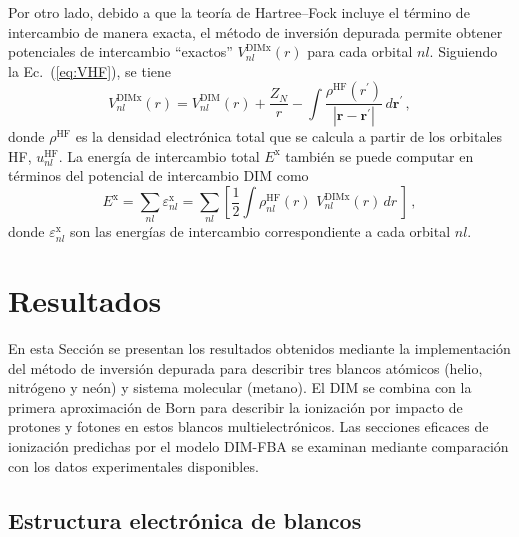 Por otro lado, debido a que la teoría de Hartree--Fock incluye el 
término de intercambio de manera exacta, el método de inversión depurada 
permite obtener potenciales de intercambio ``exactos'' 
$V_{nl}^{\mathrm{DIMx}}(r)$ para cada orbital $nl$. Siguiendo la  
Ec.~(\ref{eq:VHF}), se tiene 
\begin{equation}
V_{nl}^{\mathrm{DIMx}}(r)=V_{nl}^{\mathrm{DIM}}(r)+\frac{Z_{N}}{r}
-\int{ \frac{\rho^{\mathrm{HF}}(r^{\prime})  }
{\left| \mathbf{r} - \mathbf{r^{\prime}} \right|}} \, 
d \mathbf{r^{\prime}} \, ,
\label{eq:exchange-potential}
\end{equation}
donde $\rho^{\mathrm{HF}}$ es la densidad electrónica total que se
calcula a partir de los orbitales HF, $u^{\mathrm{HF}}_{nl}$.
La energía de intercambio total $E^{\mathrm{x}}$ también se puede 
computar en términos del potencial de intercambio DIM como
\begin{equation}
E^{\mathrm{x}} = \sum_{nl}\varepsilon_{nl}^{\mathrm{x}} = 
\sum_{nl}\left[\frac{1}{2}\int{\rho^{\mathrm{HF}}_{nl}(r) \, \, 
V_{nl}^{\mathrm{DIMx}}}(r) \, dr \, \right]\,,
\label{eq:exchange-energy}
\end{equation}
donde $\varepsilon_{nl}^{\mathrm{x}}$ son las energías de intercambio 
correspondiente a cada orbital $nl$.

\newpage
\section{Resultados}
\label{sec:dimresultados}

En esta Sección se presentan los resultados obtenidos mediante la  
implementación del método de inversión depurada para describir tres 
blancos atómicos (helio, nitrógeno y neón) y sistema molecular (metano). 
El DIM se combina con la primera aproximación de Born para describir la 
ionización por impacto de protones y fotones en estos blancos 
multielectrónicos. Las secciones eficaces de ionización predichas por el 
modelo DIM-FBA se examinan mediante comparación con los datos 
experimentales disponibles.

\subsection{Estructura electrónica de blancos}
\label{subsec:dimtarget}

